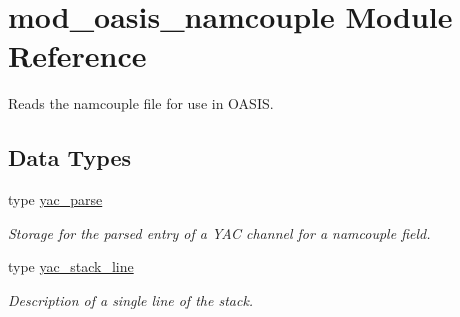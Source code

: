 \hypertarget{namespacemod__oasis__namcouple}{}\section{mod\+\_\+oasis\+\_\+namcouple Module Reference}
\label{namespacemod__oasis__namcouple}


Reads the namcouple file for use in O\+A\+S\+IS.  


\subsection*{Data Types}
\begin{DoxyCompactItemize}
\item 
type \hyperlink{structmod__oasis__namcouple_1_1yac__parse}{yac\+\_\+parse}
\begin{DoxyCompactList}\small\item\em Storage for the parsed entry of a Y\+AC channel for a namcouple field. \end{DoxyCompactList}\item 
type \hyperlink{structmod__oasis__namcouple_1_1yac__stack__line}{yac\+\_\+stack\+\_\+line}
\begin{DoxyCompactList}\small\item\em Description of a single line of the stack. \end{DoxyCompactList}\end{DoxyCompactItemize}
